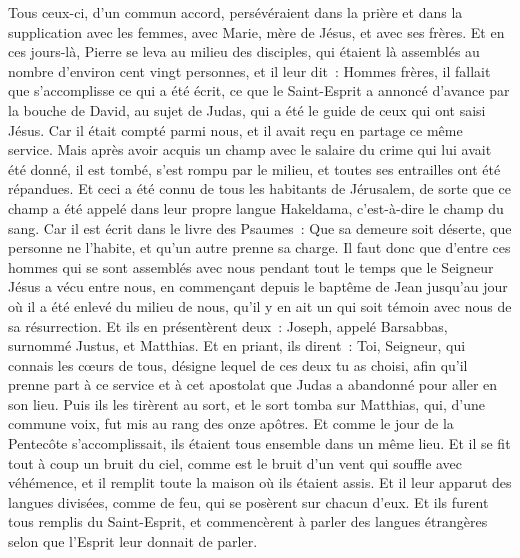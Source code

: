 \begin{multicols}{2}
Tous ceux-ci, d'un commun accord, persévéraient dans la prière et dans la supplication avec les femmes, avec Marie, mère de Jésus, et avec ses frères.
Et en ces jours-là, Pierre se leva au milieu des disciples, qui étaient là assemblés au nombre d'environ cent vingt personnes, et il leur dit~:
Hommes frères, il fallait que s'accomplisse ce qui a été écrit, ce que le Saint-Esprit a annoncé d'avance par la bouche de David, au sujet de Judas, qui a été le guide de ceux qui ont saisi Jésus.
Car il était compté parmi nous, et il avait reçu en partage ce même service.
Mais après avoir acquis un champ avec le salaire du crime qui lui avait été donné, il est tombé, s'est rompu par le milieu, et toutes ses entrailles ont été répandues.
Et ceci a été connu de tous les habitants de Jérusalem, de sorte que ce champ a été appelé dans leur propre langue Hakeldama, c'est-à-dire le champ du sang.
Car il est écrit dans le livre des Psaumes~: Que sa demeure soit déserte, que personne ne l'habite, et qu'un autre prenne sa charge.
Il faut donc que d'entre ces hommes qui se sont assemblés avec nous pendant tout le temps que le Seigneur Jésus a vécu entre nous,
en commençant depuis le baptême de Jean jusqu'au jour où il a été enlevé du milieu de nous, qu'il y en ait un qui soit témoin avec nous de sa résurrection.
Et ils en présentèrent deux~: Joseph, appelé Barsabbas, surnommé Justus, et Matthias.
Et en priant, ils dirent~: Toi, Seigneur, qui connais les cœurs de tous, désigne lequel de ces deux tu as choisi,
afin qu'il prenne part à ce service et à cet apostolat que Judas a abandonné pour aller en son lieu.
Puis ils les tirèrent au sort, et le sort tomba sur Matthias, qui, d'une commune voix, fut mis au rang des onze apôtres.
\VerseOne{}Et comme le jour de la Pentecôte s'accomplissait, ils étaient tous ensemble dans un même lieu.
Et il se fit tout à coup un bruit du ciel, comme est le bruit d'un vent qui souffle avec véhémence, et il remplit toute la maison où ils étaient assis.
Et il leur apparut des langues divisées, comme de feu, qui se posèrent sur chacun d'eux.
Et ils furent tous remplis du Saint-Esprit, et commencèrent à parler des langues étrangères selon que l'Esprit leur donnait de parler.

\end{multicols}
